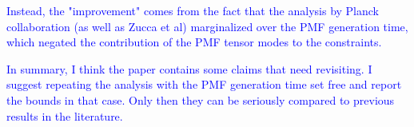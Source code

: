 \documentclass{article}
\begin{document}
\textcolor{blue}{Instead, the "improvement" comes from the fact that the analysis by Planck collaboration (as well as Zucca et al) marginalized over the PMF generation time, which negated the contribution of the PMF tensor modes to the constraints.}

\textcolor{blue}{In summary, I think the paper contains some claims that need revisiting. I suggest repeating the analysis with the PMF generation time set free and report the bounds in that case. Only then they can be seriously compared to previous results in the literature.}
\end{document}
